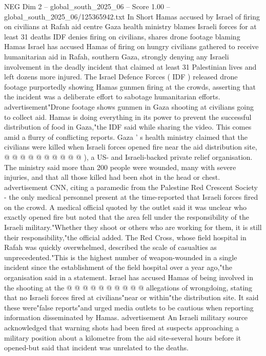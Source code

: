 \begin{textsample}{NEG Dim 2 – global\_south\_2025\_06 – Score 1.00 – global\_south\_2025\_06/125365942.txt}  \label{ex:f2_neg_200}
In Short Hamas accused by Israel of firing on civilians at Rafah aid centre Gaza health ministry blames Israeli forces for at least 31 deaths IDF denies firing on civilians, shares drone footage blaming Hamas Israel has accused Hamas of firing on hungry civilians gathered to receive humanitarian aid in Rafah, southern Gaza, strongly denying any Israeli involvement in the deadly incident that claimed at least 31 Palestinian lives and left dozens more injured.
The Israel Defence Forces ( IDF ) released drone footage purportedly showing Hamas gunmen firing at the crowds, asserting that the incident was a deliberate effort to sabotage humanitarian efforts. advertisement"Drone footage shows gunmen in Gaza shooting at civilians going to collect aid.
Hamas is doing everything in its power to prevent the successful distribution of food in Gaza,"the IDF said while sharing the video.
This comes amid a flurry of conflicting reports.
Gaza ' s health ministry claimed that the civilians were killed when Israeli forces opened fire near the aid distribution site, @ @ @ @ @ @ @ @ @ @ ), a US- and Israeli-backed private relief organisation.
The ministry said more than 200 people were wounded, many with severe injuries, and that all those killed had been shot in the head or chest. advertisement CNN, citing a paramedic from the Palestine Red Crescent Society - the only medical personnel present at the time-reported that Israeli forces fired on the crowd.
A medical official quoted by the outlet said it was unclear who exactly opened fire but noted that the area fell under the responsibility of the Israeli military."Whether they shoot or others who are working for them, it is still their responsibility,"the official added.
The Red Cross, whose field hospital in Rafah was quickly overwhelmed, described the scale of casualties as unprecedented."This is the highest number of weapon-wounded in a single incident since the establishment of the field hospital over a year ago,"the organisation said in a statement.
Israel has accused Hamas of being involved in the shooting at the @ @ @ @ @ @ @ @ @ @ allegations of wrongdoing, stating that no Israeli forces fired at civilians"near or within"the distribution site.
It said these were"false reports"and urged media outlets to be cautious when reporting information disseminated by Hamas. advertisement An Israeli military source acknowledged that warning shots had been fired at suspects approaching a military position about a kilometre from the aid site-several hours before it opened-but said that incident was unrelated to the deaths.

\end{textsample}

